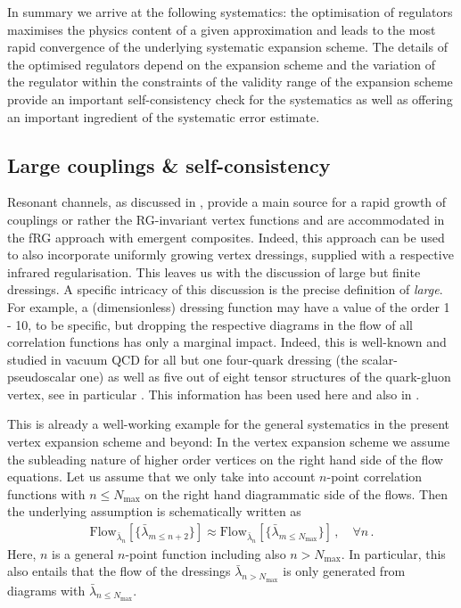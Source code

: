 \documentclass[aps,twocolumn,prd,superscriptaddress]{revtex4-2}
\begin{document}
In summary we arrive at the following systematics: the optimisation of regulators maximises the physics content of a given approximation and leads to the most rapid convergence of the underlying systematic expansion scheme. The details of the optimised regulators depend on the expansion scheme and the variation of the regulator within the constraints of the validity range of the expansion scheme provide an important self-consistency check for the systematics as well as offering an important ingredient of the systematic error estimate. 


\subsection{Large couplings \& self-consistency}
\label{sec:DivCouplings} 

Resonant channels, as discussed in , provide a main source for a rapid growth of couplings or rather the RG-invariant vertex functions and are accommodated in the fRG approach with emergent composites. Indeed, this approach can be used to also incorporate uniformly growing vertex dressings, supplied with a respective infrared regularisation. This leaves us with the discussion of large but finite dressings. A specific intricacy of this discussion is the precise definition of \textit{large}. For example, a (dimensionless) dressing function may have a value of the order 1 - 10, to be specific, but dropping the respective diagrams in the flow of all correlation functions has only a marginal impact. Indeed, this is well-known and studied in vacuum QCD for all but one four-quark dressing (the scalar-pseudoscalar one) as well as five out of eight tensor structures of the quark-gluon vertex, see in particular \cite{Mitter:2014wpa, Cyrol:2017ewj}. This information has been used here and also in \cite{Fu:2019hdw}.  

This is already a well-working example for the general systematics in the present vertex expansion scheme and beyond: In the vertex expansion scheme we assume the subleading nature of higher order vertices on the right hand side of the flow equations. Let us assume that we only take into account 
$n$-point correlation functions with $n\leq N_\textrm{max}$ on the right hand diagrammatic side of the flows. Then the underlying assumption is schematically written as 
%
\begin{align} 
	\textrm{Flow}_{\bar \lambda_n}[\{ \bar \lambda_{m\leq n+2}\} ] \approx 	\textrm{Flow}_{\bar \lambda_n}[\{ \bar \lambda_{m\leq N_\textrm{max}}\} ]\,,\quad \forall n\,.
\label{eq:VertexExpansionSys}
\end{align}
%
Here, $n$ is a general $n$-point function including also $n>N_\textrm{max}$. In particular, this also entails that the flow of the dressings $\bar\lambda_{n>N_\textrm{max}}$ is only generated from diagrams with $\bar\lambda_{n\leq N_\textrm{max}}$. 
\end{document}
